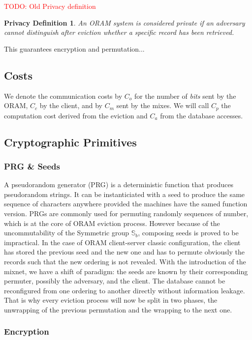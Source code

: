 \documentclass[english,oneside,twocolumn]{article}
\newtheorem{privdef}{Privacy Definition}
\newcommand{\todo}[1]{\textcolor{red}{TODO: #1}}
\begin{document}
\todo{Old Privacy definition}

\begin{privdef}
An ORAM system is considered private if an adversary cannot distinguish after eviction whether a specific record has been retrieved. 
\end{privdef}

This guarantees encryption and permutation...

\subsection{Costs}
We denote the communication costs by $C_o$ for the number of \emph{bits} sent by the ORAM, $C_{c}$ by the client, and by $C_{m}$ sent by the mixes. 
We will call $C_p$ the computation cost derived from the eviction and $C_a$ from the database accesses.

\subsection{Cryptographic Primitives}

\subsubsection{PRG \& Seeds}
A pseudorandom generator (PRG) is a deterministic function that produces pseudorandom strings. It can be instanticiated with a seed to produce the same sequence of characters anywhere provided the machines have the samed function version.
PRGs are commonly used for permuting randomly sequences of number, which is at the core of ORAM eviction process. However because of the uncommutability of the Symmetric group $\mathbb{S}_b$, composing seeds is proved to be impractical.
In the case of ORAM client-server classic configuration, the client has stored the previous seed and the new one and has to permute obviously the records such that the new ordering is not revealed.
With the introduction of the mixnet, we have a shift of paradigm: the seeds are known by their corresponding permuter, possibly the adversary, and the client. The database cannot be reconfigured from one ordering to another directly without information leakage. That is why every eviction process will now be split in two phases, the unwrapping of the previous permutation and the wrapping to the next one.

\subsubsection{Encryption}
\end{document}
